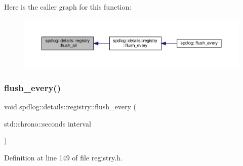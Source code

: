 Here is the caller graph for this function\+:
\nopagebreak
\begin{figure}[H]
\begin{center}
\leavevmode
\includegraphics[width=350pt]{classspdlog_1_1details_1_1registry_a3abe5826eebb056d51dd0dd75beed42d_icgraph}
\end{center}
\end{figure}
\mbox{\label{classspdlog_1_1details_1_1registry_a78eb75a31640c0bb204d7f2123ba825c}} 
\subsubsection{\texorpdfstring{flush\+\_\+every()}{flush\_every()}}
{\footnotesize\ttfamily void spdlog\+::details\+::registry\+::flush\+\_\+every (\begin{DoxyParamCaption}\item[{std\+::chrono\+::seconds}]{interval }\end{DoxyParamCaption})\hspace{0.3cm}{\ttfamily [inline]}}



Definition at line 149 of file registry.\+h.

